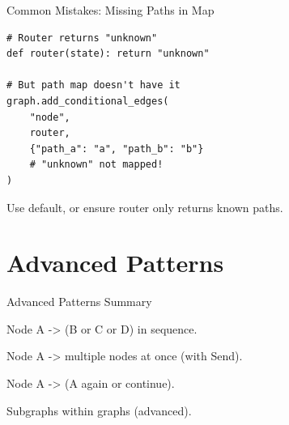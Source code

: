 \documentclass[aspectratio=169,11pt]{beamer}
\begin{document}
\begin{frame}[fragile,t]{Common Mistakes: Missing Paths in Map}
\vspace{0.1cm}

\begin{warningbox}
\begin{lstlisting}
# Router returns "unknown"
def router(state): return "unknown"

# But path map doesn't have it
graph.add_conditional_edges(
    "node",
    router,
    {"path_a": "a", "path_b": "b"}
    # "unknown" not mapped!
)
\end{lstlisting}
\end{warningbox}

\vspace{0.15cm}

\begin{tipbox}[Fix]
Use default, or ensure router only returns known paths.
\end{tipbox}
\end{frame}

\section{Advanced Patterns}
\begin{frame}[t]{Advanced Patterns Summary}
\setlength{\itemsep}{1pt}
\vspace{0.1cm}

\begin{tipbox}
Node A -> (B or C or D) in sequence.
\end{tipbox}

\vspace{0.1cm}

\begin{tipbox}
Node A -> multiple nodes at once (with Send).
\end{tipbox}

\vspace{0.1cm}

\begin{tipbox}[Looping]
Node A -> (A again or continue).
\end{tipbox}

\vspace{0.1cm}

\begin{tipbox}[Hierarchical]
Subgraphs within graphs (advanced).
\end{tipbox}
\end{frame}
\end{document}
